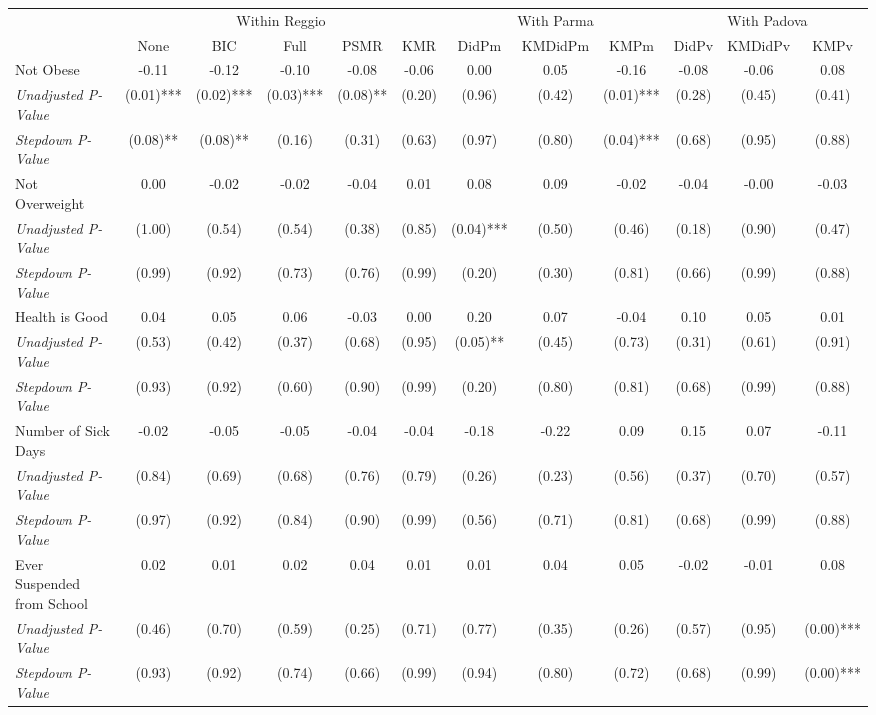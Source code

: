 \begin{tabular}{l c c c c c c c c c c c}
\toprule
& \multicolumn{5}{c}{Within Reggio} & \multicolumn{3}{c}{With Parma} & \multicolumn{3}{c}{With Padova} \\\cmidrule(lr){2-6} \cmidrule(lr){7-9} \cmidrule(lr){10-12}
 & None & BIC & Full & PSMR & KMR & DidPm & KMDidPm & KMPm & DidPv & KMDidPv & KMPv \\
\midrule
Not Obese & -0.11 & -0.12 & -0.10 & -0.08 & -0.06 & 0.00 & 0.05 & -0.16 & -0.08 & -0.06 & 0.08 \\
\quad \textit{Unadjusted P-Value} & (0.01)*** & (0.02)*** & (0.03)*** & (0.08)** & (0.20) & (0.96) & (0.42) & (0.01)*** & (0.28) & (0.45) & (0.41) \\
\quad \textit{Stepdown P-Value} & (0.08)** & (0.08)** & (0.16) & (0.31) & (0.63) & (0.97) & (0.80) & (0.04)*** & (0.68) & (0.95) & (0.88) \\
Not Overweight & 0.00 & -0.02 & -0.02 & -0.04 & 0.01 & 0.08 & 0.09 & -0.02 & -0.04 & -0.00 & -0.03 \\
\quad \textit{Unadjusted P-Value} & (1.00) & (0.54) & (0.54) & (0.38) & (0.85) & (0.04)*** & (0.50) & (0.46) & (0.18) & (0.90) & (0.47) \\
\quad \textit{Stepdown P-Value} & (0.99) & (0.92) & (0.73) & (0.76) & (0.99) & (0.20) & (0.30) & (0.81) & (0.66) & (0.99) & (0.88) \\
Health is Good & 0.04 & 0.05 & 0.06 & -0.03 & 0.00 & 0.20 & 0.07 & -0.04 & 0.10 & 0.05 & 0.01 \\
\quad \textit{Unadjusted P-Value} & (0.53) & (0.42) & (0.37) & (0.68) & (0.95) & (0.05)** & (0.45) & (0.73) & (0.31) & (0.61) & (0.91) \\
\quad \textit{Stepdown P-Value} & (0.93) & (0.92) & (0.60) & (0.90) & (0.99) & (0.20) & (0.80) & (0.81) & (0.68) & (0.99) & (0.88) \\
Number of Sick Days & -0.02 & -0.05 & -0.05 & -0.04 & -0.04 & -0.18 & -0.22 & 0.09 & 0.15 & 0.07 & -0.11 \\
\quad \textit{Unadjusted P-Value} & (0.84) & (0.69) & (0.68) & (0.76) & (0.79) & (0.26) & (0.23) & (0.56) & (0.37) & (0.70) & (0.57) \\
\quad \textit{Stepdown P-Value} & (0.97) & (0.92) & (0.84) & (0.90) & (0.99) & (0.56) & (0.71) & (0.81) & (0.68) & (0.99) & (0.88) \\
Ever Suspended from School & 0.02 & 0.01 & 0.02 & 0.04 & 0.01 & 0.01 & 0.04 & 0.05 & -0.02 & -0.01 & 0.08 \\
\quad \textit{Unadjusted P-Value} & (0.46) & (0.70) & (0.59) & (0.25) & (0.71) & (0.77) & (0.35) & (0.26) & (0.57) & (0.95) & (0.00)*** \\
\quad \textit{Stepdown P-Value} & (0.93) & (0.92) & (0.74) & (0.66) & (0.99) & (0.94) & (0.80) & (0.72) & (0.68) & (0.99) & (0.00)*** \\
\bottomrule
\end{tabular}
